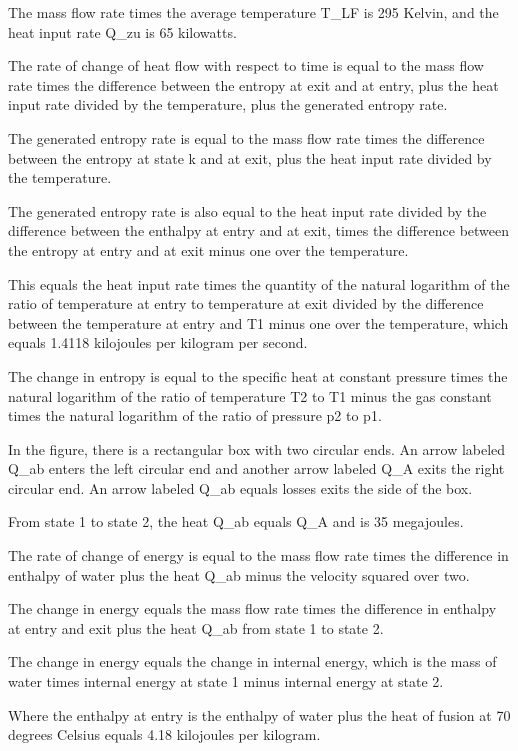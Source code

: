 The mass flow rate times the average temperature T_LF is 295 Kelvin, and the heat input rate Q_zu is 65 kilowatts.

The rate of change of heat flow with respect to time is equal to the mass flow rate times the difference between the entropy at exit and at entry, plus the heat input rate divided by the temperature, plus the generated entropy rate.

The generated entropy rate is equal to the mass flow rate times the difference between the entropy at state k and at exit, plus the heat input rate divided by the temperature.

The generated entropy rate is also equal to the heat input rate divided by the difference between the enthalpy at entry and at exit, times the difference between the entropy at entry and at exit minus one over the temperature.

This equals the heat input rate times the quantity of the natural logarithm of the ratio of temperature at entry to temperature at exit divided by the difference between the temperature at entry and T1 minus one over the temperature, which equals 1.4118 kilojoules per kilogram per second.

The change in entropy is equal to the specific heat at constant pressure times the natural logarithm of the ratio of temperature T2 to T1 minus the gas constant times the natural logarithm of the ratio of pressure p2 to p1.

In the figure, there is a rectangular box with two circular ends. An arrow labeled Q_ab enters the left circular end and another arrow labeled Q_A exits the right circular end. An arrow labeled Q_ab equals losses exits the side of the box.

From state 1 to state 2, the heat Q_ab equals Q_A and is 35 megajoules.

The rate of change of energy is equal to the mass flow rate times the difference in enthalpy of water plus the heat Q_ab minus the velocity squared over two.

The change in energy equals the mass flow rate times the difference in enthalpy at entry and exit plus the heat Q_ab from state 1 to state 2.

The change in energy equals the change in internal energy, which is the mass of water times internal energy at state 1 minus internal energy at state 2.

Where the enthalpy at entry is the enthalpy of water plus the heat of fusion at 70 degrees Celsius equals 4.18 kilojoules per kilogram.

